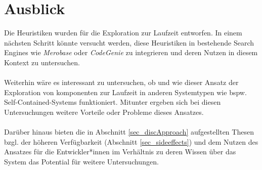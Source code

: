 \section{Ausblick}
Die \Gls{Heuristik}en wurden für die Exploration zur Laufzeit entworfen. In einem nächsten Schritt könnte versucht werden, diese \gls{Heuristik}en in bestehende Search \Gls{Engine}s wie \emph{Merobase} oder \emph{CodeGenie} zu integrieren und deren Nutzen in diesem Kontext zu untersuchen.
\\\\
Weiterhin wäre es interessant zu untersuchen, ob und wie dieser Ansatz der Exploration von \Gls{komponente}n zur Laufzeit in anderen Systemtypen wie bspw. Self-Contained-Systems funktioniert. Mitunter ergeben sich bei diesen Untersuchungen weitere Vorteile oder Probleme dieses Ansatzes.
\\\\
Darüber hinaus bieten die in Abschnitt \ref{sec_discApproach} aufgestellten Thesen bzgl. der höheren Verfügbarkeit (Abschnitt \ref{sec_sideeffects}) und dem Nutzen des Ansatzes für die Entwickler*innen im Verhältnis zu deren Wissen über das System das Potential für weitere Untersuchungen.